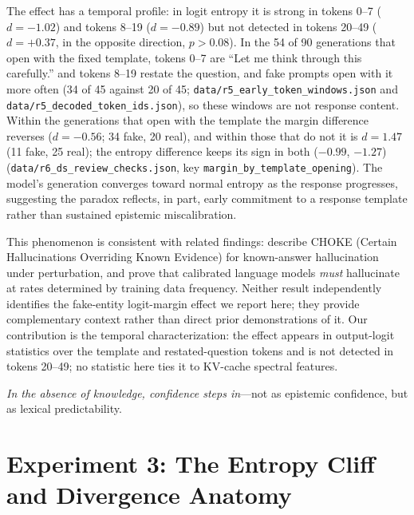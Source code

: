 \documentclass[11pt,a4paper]{article}
\begin{document}
The effect has a temporal profile: in logit entropy it is strong in tokens 0--7 ($d{=}-1.02$) and tokens 8--19 ($d{=}-0.89$) but not detected in tokens 20--49 ($d{=}{+}0.37$, in the opposite direction, $p{>}0.08$). In the 54 of 90 generations that open with the fixed template, tokens 0--7 are ``Let me think through this carefully.'' and tokens 8--19 restate the question, and fake prompts open with it more often (34 of 45 against 20 of 45; \texttt{data/r5\_early\_token\_windows.json} and \texttt{data/r5\_decoded\_token\_ids.json}), so these windows are not response content. Within the generations that open with the template the margin difference reverses ($d{=}{-}0.56$; 34 fake, 20 real), and within those that do not it is $d{=}1.47$ (11 fake, 25 real); the entropy difference keeps its sign in both ($-0.99$, $-1.27$) (\texttt{data/\allowbreak r6\_\allowbreak ds\_\allowbreak review\_\allowbreak checks.json}, key \texttt{margin\_\allowbreak by\_\allowbreak template\_\allowbreak opening}). The model's generation converges toward normal entropy as
the response progresses, suggesting the paradox reflects, in part, early
commitment to a response template rather than sustained epistemic
miscalibration.

This phenomenon is consistent with related findings: \citet{simhi2025trust}
describe CHOKE (Certain Hallucinations Overriding Known Evidence) for
known-answer hallucination under perturbation, and \citet{kalai2024calibrated}
prove that calibrated language models \emph{must} hallucinate at rates
determined by training data frequency. Neither result independently
identifies the fake-entity logit-margin effect we report here; they
provide complementary context rather than direct prior demonstrations of
it. Our contribution is the temporal characterization: the effect appears in output-logit statistics over the template and restated-question tokens and is not detected in tokens 20--49; no statistic here ties it to KV-cache spectral features.

\emph{In the absence of knowledge, confidence steps in}---not as
epistemic confidence, but as lexical predictability.

\section{Experiment 3: The Entropy Cliff and Divergence Anatomy}
\label{sec:divergence}
\end{document}
